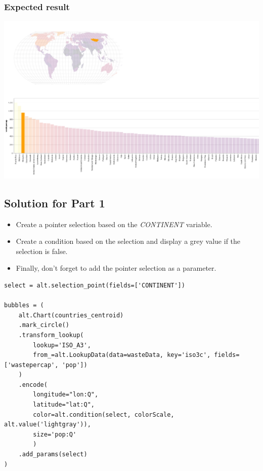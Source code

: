 \documentclass[11pt]{article}
\begin{document}
\subsubsection*{Expected result}

\begin{center}
\includegraphics[width=.6\textwidth]{visualization (9).png}
\end{center}

\subsection*{Solution for Part 1}

\begin{itemize}
    \item Create a pointer selection based on the \textit{CONTINENT} variable.
    \item Create a condition based on the selection and display a grey value if the selection is false.
    \item Finally, don't forget to add the pointer selection as a parameter.
\end{itemize}


\begin{verbatim}
select = alt.selection_point(fields=['CONTINENT'])

bubbles = (
    alt.Chart(countries_centroid)
    .mark_circle()
    .transform_lookup(
        lookup='ISO_A3',
        from_=alt.LookupData(data=wasteData, key='iso3c', fields=['wastepercap', 'pop'])
    )
    .encode(
        longitude="lon:Q",
        latitude="lat:Q",
        color=alt.condition(select, colorScale, alt.value('lightgray')),
        size='pop:Q'
        )
    .add_params(select)
)
\end{verbatim}
\end{document}
